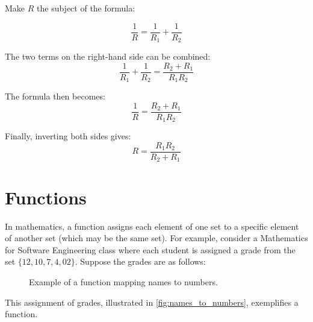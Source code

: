 \begin{example} Make \(R\) the subject of the formula:

\[
\frac{1}{R} = \frac{1}{R_1} + \frac{1}{R_2}
\]
\begin{solution}
The two terms on the right-hand side can be combined:
\[
\frac{1}{R_1} + \frac{1}{R_2} = \frac{R_2 + R_1}{R_1R_2}
\]

The formula then becomes:
\[
\frac{1}{R} = \frac{R_2 + R_1}{R_1R_2}
\]

Finally, inverting both sides gives:
\[
R = \frac{R_1R_2}{R_2 + R_1}
\]

\end{solution}
\end{example}

\section{Functions}
In mathematics, a function assigns each element of one set to a specific element of another set (which may be the same set). For example, consider a Mathematics for Software Engineering class where each student is assigned a grade from the set \(\{12, 10, 7, 4, 02\}\). Suppose the grades are as follows:

\begin{figure}[htbp]
    \centering
    \caption{Example of a function mapping names to numbers.}
    \label{fig:names_to_numbers}
\end{figure}


This assignment of grades, illustrated in \autoref{fig:names_to_numbers}, exemplifies a function.

